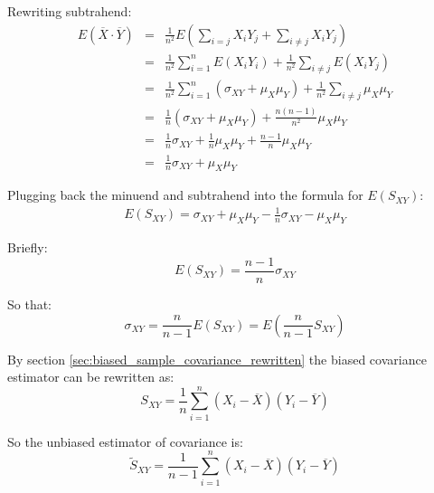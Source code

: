 \documentclass[12pt]{article}
\begin{document}
Rewriting subtrahend:
\begin{eqnarray*}
E(\overline{X} \cdot \overline{Y})  &=& 
\frac{1}{n^2}E \left(
\sum_{i=j} X_i Y_j + \sum_{i \neq j} X_i Y_j
\right) \\
&=&
\frac{1}{n^2} \sum_{i=1}^{n}E(X_i Y_i) +
\frac{1}{n^2} \sum_{i \neq j}E(X_i Y_j) \\
&=&
\frac{1}{n^2} \sum_{i=1}^{n} \left( \sigma_{XY} + \mu_X \mu_Y \right) +
\frac{1}{n^2} \sum_{i \neq j} \mu_X \mu_Y \\
&=&
\frac{1}{n} \left( \sigma_{XY} + \mu_X \mu_Y \right) +
\frac{n(n-1)}{n^2} \mu_X \mu_Y \\
&=&
\frac{1}{n}\sigma_{XY} + \frac{1}{n}\mu_X \mu_Y +
\frac{n-1}{n} \mu_X \mu_Y \\
&=&
\frac{1}{n}\sigma_{XY} + \mu_X \mu_Y 
\end{eqnarray*}

Plugging back the minuend and subtrahend into the formula for $E(S_{XY})$:
\begin{eqnarray*}
E(S_{XY}) = \sigma_{XY} + \mu_X \mu_Y - \frac{1}{n}\sigma_{XY} - \mu_X \mu_Y
\end{eqnarray*}

Briefly:
\begin{equation*}
E(S_{XY}) = \frac{n-1}{n}\sigma_{XY}
\end{equation*}

So that:
\begin{equation*}
\sigma_{XY} = \frac{n}{n-1} E(S_{XY}) = E(\frac{n}{n-1} S_{XY})
\end{equation*}

By section \ref{sec:biased_sample_covariance_rewritten} the biased covariance estimator
can be rewritten as:
\begin{equation*}
S_{XY} = \frac{1}{n} \sum_{i=1}^{n}(X_i - \overline{X})(Y_i - \overline{Y})
\end{equation*}

So the unbiased estimator of covariance is:
\begin{equation*}
\tilde{S}_{XY} = \frac{1}{n-1} \sum_{i=1}^{n} (X_i - \overline{X}) (Y_i - \overline{Y})
\end{equation*}
\end{document}
